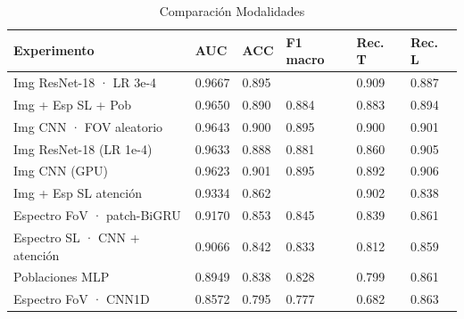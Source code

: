\documentclass[12pt]{article}
\begin{document}
\begin{table}[H]
\centering
\small
\begin{tabular}{|p{}|p{}|p{}|p{}|p{}|p{}|}
\hline
\textbf{Experimento} & \textbf{AUC} & \textbf{ACC} & \textbf{F1 macro} & \textbf{Rec. T}& \textbf{Rec. L} \\ \hline

Img ResNet-18 · LR 3e-4 &
0.9667 &
0.895 &
 &
0.909 &
0.887 \\ \hline

Img + Esp SL + Pob &
0.9650 &
0.890 &
0.884 &
0.883 &
0.894 \\ \hline

Img CNN · FOV aleatorio &
0.9643 &
0.900 &
0.895 &
0.900 &
0.901 \\ \hline

Img ResNet-18 (LR 1e-4) &
0.9633 &
0.888 &
0.881 &
0.860 &
0.905 \\ \hline

Img CNN (GPU) &
0.9623 &
0.901 &
0.895 &
0.892 &
0.906 \\ \hline

Img + Esp SL atención &
0.9334 &
0.862 &
 &
0.902 &
0.838 \\ \hline

Espectro FoV · patch-BiGRU &
0.9170 &
0.853 &
0.845 &
0.839 &
0.861 \\ \hline

Espectro SL · CNN + atención &
0.9066 &
0.842 &
0.833 &
0.812 &
0.859 \\ \hline

Poblaciones MLP &
0.8949 &
0.838 &
0.828 &
0.799 &
0.861 \\ \hline

Espectro FoV · CNN1D &
0.8572 &
0.795 &
0.777 &
0.682 &
0.863 \\ \hline

\end{tabular}
\caption{Comparación Modalidades}
\label{aplicacion}
\end{table}
\end{document}
